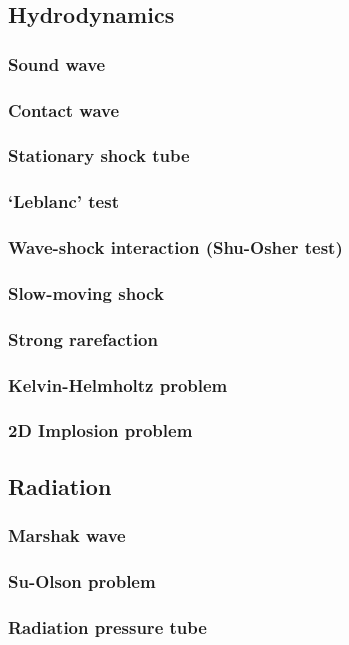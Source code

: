 \documentclass[fleqn,usenatbib]{mnras}
\begin{document}
\subsection{Hydrodynamics}
\subsubsection{Sound wave}
\subsubsection{Contact wave}
\subsubsection{Stationary shock tube}
\subsubsection{`Leblanc' test}
\subsubsection{Wave-shock interaction (Shu-Osher test)}
\subsubsection{Slow-moving shock}
\subsubsection{Strong rarefaction}
\subsubsection{Kelvin-Helmholtz problem}
\subsubsection{2D Implosion problem}

\subsection{Radiation}
\subsubsection{Marshak wave}
\subsubsection{Su-Olson problem}
\subsubsection{Radiation pressure tube}
\end{document}
